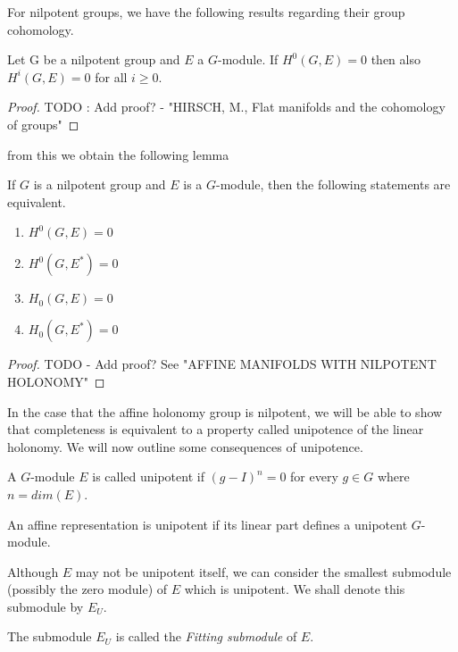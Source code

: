 For nilpotent groups, we have the following results regarding their group
cohomology.

\begin{lemma}
    Let G be a nilpotent group and $E$ a $G$-module. If $H^0(G, E) = 0$ then
    also $H^i(G, E) = 0$ for all $i \geq 0$.
\end{lemma}
\begin{proof}
    TODO : Add proof? - "HIRSCH, M., Flat manifolds and the cohomology of groups"
\end{proof}

from this we obtain the following lemma
\begin{lemma}
    If $G$ is a nilpotent group and $E$ is a $G$-module, then the following statements are equivalent.

    \begin{enumerate}
        \item $H^0(G, E) = 0$
        \item $H^0(G, E^*) = 0$
        \item $H_0(G, E) = 0$
        \item $H_0(G, E^*) = 0$
    \end{enumerate}
\end{lemma}

\begin{proof}
    TODO - Add proof? See "AFFINE MANIFOLDS WITH NILPOTENT HOLONOMY"
\end{proof}

In the case that the affine holonomy group is nilpotent, we will be able to
show that completeness is equivalent to a property called unipotence of the
linear holonomy. We will now outline some consequences of unipotence.

\begin{definition}[Unipotent]
    A $G$-module $E$ is called unipotent if $(g-I)^n = 0$ for every $g \in G$
    where $n = dim(E)$.
\end{definition}
\begin{remark}
    An affine representation is unipotent if its linear part defines a unipotent
    $G$-module.
\end{remark}

Although $E$ may not be unipotent itself, we can consider the smallest
submodule (possibly the zero module) of $E$ which is unipotent. We shall denote
this submodule by $E_U$.

\begin{remark}
    The submodule $E_U$ is called the \textit{Fitting submodule} of $E$.
\end{remark}

